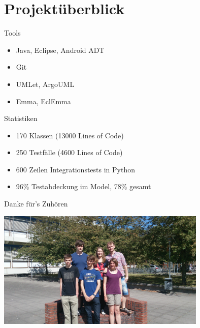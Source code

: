 \section{Projektüberblick}

\begin{frame}{Tools}
	\begin{itemize}
		\item Java, Eclipse, Android ADT
		\item Git
		\item UMLet, ArgoUML
		\item Emma, EclEmma
	\end{itemize}
\end{frame}

\begin{frame}{Statistiken}
	\begin{itemize}
		\item 170 Klassen (13000 Lines of Code)
		\item 250 Testfälle (4600 Lines of Code)
		\item 600 Zeilen Integrationstests in Python
		\item 96\% Testabdeckung im Model, 78\% gesamt
	\end{itemize}
\end{frame}

\begin{frame}{Danke für's Zuhören}
	\begin{center}
		\includegraphics[width=10cm,type=jpg,ext=.jpg,read=.jpg]{media/2014-06-24 10.56.29}
	\end{center}
\end{frame}

